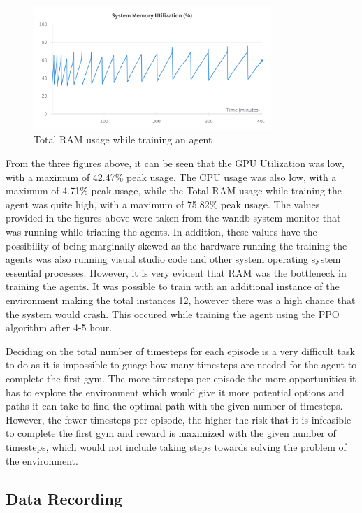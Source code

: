 \begin{figure}[H]
    \centering
    \includegraphics[width=0.8\textwidth]{figures/System_RAM_Utilization.png}
    \caption{Total RAM usage while training an agent}
    \label{fig:sys_memory_useage}
\end{figure}

From the three figures above, it can be seen that the GPU Utilization was low, with a maximum of 42.47\% peak usage. The CPU usage was also low, with a maximum of 4.71\% peak usage, while the Total RAM usage while training the agent was quite high, with a maximum of 75.82\% peak usage. The values provided in the figures above were taken from the wandb system monitor that was running while trianing the agents. In addition, these values have the possibility of being marginally skewed as the hardware running the training the agents was also running visual studio code and other system operating system essential processes. However, it is very evident that RAM was the bottleneck in training the agents. It was possible to train with an additional instance of the environment making the total instances 12, however there was a high chance that the system would crash. This occured while training the agent using the PPO algorithm after 4-5 hour. 

Deciding on the total number of timesteps for each episode is a very difficult task to do as it is impossible to guage how many timesteps are needed for the agent to complete the first gym. The more timesteps per episode the more opportunities it has to explore the environment which would give it more potential options and paths it can take to find the optimal path with the given number of timesteps. However, the fewer timesteps per episode, the higher the risk that it is infeasible to complete the first gym and reward is maximized with the given number of timesteps, which would not include taking steps towards solving the problem of the environment. 

\subsection{Data Recording}

